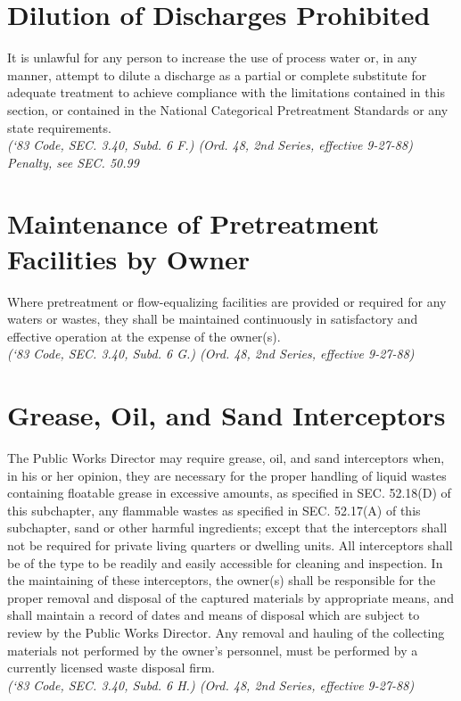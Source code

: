 \section{Dilution of Discharges Prohibited}
It is unlawful for any person to increase the use of process water or, in any manner, attempt to dilute a discharge as a partial or complete substitute for adequate treatment to achieve compliance with the limitations contained in this section, or contained in the National Categorical Pretreatment Standards or any state requirements.\\
\emph{(‘83 Code, SEC. 3.40, Subd. 6 F.) (Ord. 48, 2nd Series, effective 9-27-88)}\\
\emph{Penalty, see SEC. 50.99}
\section{Maintenance of Pretreatment Facilities by Owner}
Where pretreatment or flow-equalizing facilities are provided or required for any waters or wastes, they shall be maintained continuously in satisfactory and effective operation at the expense of the owner(s).\\
\emph{(‘83 Code, SEC. 3.40, Subd. 6 G.) (Ord. 48, 2nd Series, effective 9-27-88)}
\section{Grease, Oil, and Sand Interceptors}
The Public Works Director may require grease, oil, and sand interceptors when, in his or her opinion, they are necessary for the proper handling of liquid wastes containing floatable grease in excessive amounts, as specified in SEC. 52.18(D) of this subchapter, any flammable wastes as specified in SEC. 52.17(A) of this subchapter, sand or other harmful ingredients; except that the interceptors shall not be required for private living quarters or dwelling units.  All interceptors shall be of the type to be readily and easily accessible for cleaning and inspection.  In the maintaining of these interceptors, the owner(s) shall be responsible for the proper removal and disposal of the captured materials by appropriate means, and shall maintain a record of dates and means of disposal which are subject to review by the Public Works Director.  Any removal and hauling of the collecting materials not performed by the owner’s personnel, must be performed by a currently licensed waste disposal firm.\\
\emph{(‘83 Code, SEC. 3.40, Subd. 6 H.) (Ord. 48, 2nd Series, effective 9-27-88)}\\


